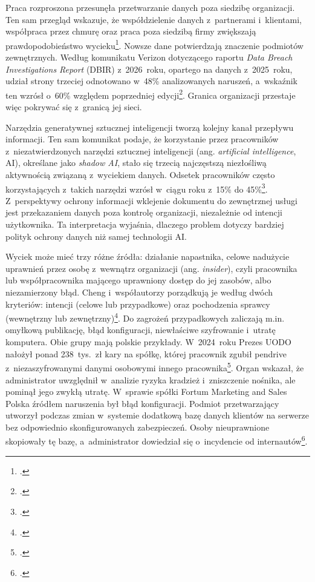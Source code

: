 \documentclass[12pt,a4paper]{article}
\begin{document}
Praca rozproszona przesunęła przetwarzanie danych poza siedzibę organizacji.
Ten sam przegląd wskazuje, że współdzielenie danych z~partnerami i~klientami,
współpraca przez chmurę oraz praca poza siedzibą firmy zwiększają
prawdopodobieństwo wycieku\footcite{cheng2017enterprise}. Nowsze dane
potwierdzają znaczenie podmiotów zewnętrznych. Według komunikatu Verizon
dotyczącego raportu \emph{Data Breach
Investigations Report} (DBIR) z~2026~roku, opartego na danych z~2025~roku, udział strony
trzeciej odnotowano w~48\% analizowanych naruszeń, a~wskaźnik ten wzrósł
o~60\% względem poprzedniej edycji\footcite{verizon2026dbir}. Granica
organizacji przestaje więc pokrywać się z~granicą jej sieci.

Narzędzia generatywnej sztucznej inteligencji tworzą kolejny kanał przepływu
informacji. Ten sam komunikat podaje, że korzystanie przez pracowników
z~niezatwierdzonych narzędzi sztucznej inteligencji (ang.
\emph{artificial intelligence}, AI), określane jako \emph{shadow AI}, stało się trzecią
najczęstszą niezłośliwą aktywnością związaną z~wyciekiem danych. Odsetek
pracowników często korzystających z~takich narzędzi wzrósł w~ciągu roku
z~15\% do 45\%\footcite{verizon2026dbir}. Z~perspektywy ochrony informacji
wklejenie dokumentu do zewnętrznej usługi jest przekazaniem danych poza
kontrolę organizacji, niezależnie od intencji użytkownika. Ta interpretacja
wyjaśnia, dlaczego problem dotyczy bardziej polityk ochrony danych niż samej
technologii AI.

Wyciek może mieć trzy różne źródła: działanie napastnika, celowe nadużycie
uprawnień przez osobę z~wewnątrz organizacji (ang. \emph{insider}), czyli
pracownika lub współpracownika mającego uprawniony dostęp do jej zasobów,
albo niezamierzony błąd. Cheng
i~współautorzy porządkują je według dwóch kryteriów: intencji (celowe lub
przypadkowe) oraz pochodzenia sprawcy (wewnętrzny lub
zewnętrzny)\footcite{cheng2017enterprise}. Do zagrożeń przypadkowych zaliczają
m.in. omyłkową publikację, błąd konfiguracji, niewłaściwe szyfrowanie i~utratę
komputera. Obie grupy mają polskie przykłady. W~2024~roku Prezes UODO nałożył
ponad 238~tys.~zł kary na spółkę, której pracownik zgubił pendrive
z~niezaszyfrowanymi danymi osobowymi innego pracownika\footcite{uodo2024pendrive}.
Organ wskazał, że administrator uwzględnił w~analizie ryzyka kradzież
i~zniszczenie nośnika, ale pominął jego zwykłą utratę. W~sprawie spółki
Fortum Marketing and Sales Polska źródłem naruszenia był błąd konfiguracji.
Podmiot przetwarzający utworzył podczas zmian w~systemie dodatkową bazę danych
klientów na serwerze bez odpowiednio skonfigurowanych zabezpieczeń. Osoby
nieuprawnione skopiowały tę bazę, a~administrator dowiedział się o~incydencie
od internautów\footcite{uodo2022fortum}.
\end{document}
